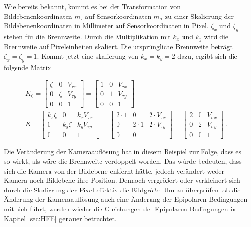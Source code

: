 Wie bereits bekannt, kommt es bei der Transformation von Bildebenenkoordinaten $m_\tau$ auf Sensorkoordinaten $m_\sigma$ zu einer Skalierung der Bildebenenkoordinaten in Millimeter auf Sensorkoordinaten in Pixel. $\zeta_x$ und $\zeta_y$ stehen für die Brennweite. Durch die Multiplikation mit $k_x$ und $k_y$ wird die Brennweite auf Pixeleinheiten skaliert. Die ursprüngliche Brennweite beträgt $\zeta_x = \zeta_y = 1$. Kommt jetzt eine skalierung von $k_x = k_y = 2$ dazu, ergibt sich die folgende Matrix


\begin{gather}
	K_0=  \begin{bmatrix}
		\zeta & 0 & V_{\tau x}\\
		0 & \zeta & V_{\tau y}\\
		0 & 0   & 1 
	\end{bmatrix} =
	\begin{bmatrix}
	1 & 0 &  V_{\tau x}\\
	0 & 1 &  V_{\tau y}\\
	0 & 0 & 1 
\end{bmatrix}\\
	K= \begin{bmatrix}
		k_x \zeta & 0 & k_x V_{\tau x}\\
		0 & k_y \zeta & k_y V_{\tau y}\\
		0 & 0   & 1 
	\end{bmatrix} =
	\begin{bmatrix}
	2 \cdot 1 & 0 & 2 \cdot V_{\tau x}\\
	0 & 2 \cdot 1 & 2 \cdot V_{\tau y}\\
	0 & 0   & 1 
\end{bmatrix} = 
\begin{bmatrix}
	2 & 0 & V_{\sigma x}\\
	0 & 2 & V_{\sigma y}\\
	0 & 0 & 1 
\end{bmatrix} \, .
\end{gather}

Die Veränderung der Kameraauflösung hat in diesem Beispiel zur Folge, dass es so wirkt, als wäre die Brennweite verdoppelt worden. Das würde bedeuten, dass sich die Kamera von der Bildebene entfernt hätte, jedoch verändert weder Kamera noch Bildebene ihre Position. Dennoch vergrößert oder verkleinert sich durch die Skalierung der Pixel effektiv die Bildgröße. Um zu überprüfen. ob die Änderung der Kameraauflösung auch eine Änderung der Epipolaren Bedingungen mit sich führt, werden wieder die Gleichungen der Epipolaren Bedingungen in Kapitel \ref{sec:HFE} genauer betrachtet.\\

